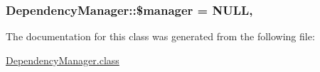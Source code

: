 \hypertarget{classDependencyManager_a8679939d89361bdc35730f4391a0fa36}{
\subsubsection[{\$manager}]{\setlength{\rightskip}{0pt plus 5cm}Dependency\-Manager\-::\$manager = N\-U\-L\-L\hspace{0.3cm}{\ttfamily [static]}, {\ttfamily [private]}}}\label{classDependencyManager_a8679939d89361bdc35730f4391a0fa36}


The documentation for this class was generated from the following file\-:\begin{DoxyCompactItemize}
\item 
\hyperlink{DependencyManager_8class}{Dependency\-Manager.\-class}\end{DoxyCompactItemize}
